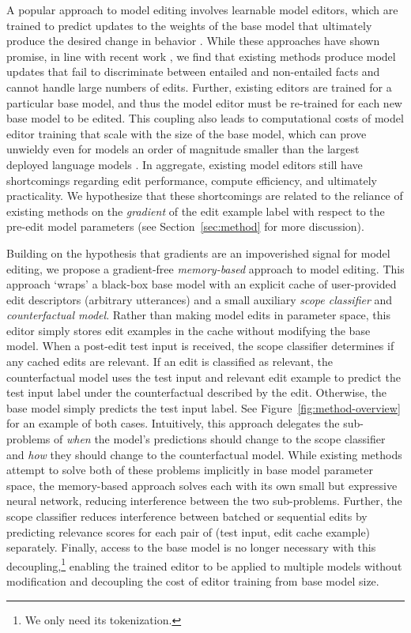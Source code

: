 \documentclass{article}
\begin{document}


A popular approach to model editing involves learnable model editors, which are trained to predict updates to the weights of the base model that ultimately produce the desired change in behavior \citep{Sinitsin2020Editable,Cao2021EditingFK,mitchell2021fast,hase2021language}. While these approaches have shown promise, in line with recent work \citep{hase2021language}, we find that existing methods produce model updates that fail to discriminate between entailed and non-entailed facts and cannot handle large numbers of edits. Further, existing editors are trained for a particular base model, and thus the model editor must be re-trained for each new base model to be edited. This coupling also leads to computational costs of model editor training that scale with the size of the base model, which can prove unwieldy even for models an order of magnitude smaller than the largest deployed language models \citep{mitchell2021fast}. In aggregate, existing model editors still have shortcomings regarding edit performance, compute efficiency, and ultimately practicality. We hypothesize that these shortcomings are related to the reliance of existing methods on the \textit{gradient} of the edit example label with respect to the pre-edit model parameters (see Section~\ref{sec:method} for more discussion).



Building on the hypothesis that gradients are an impoverished signal for model editing, we propose a gradient-free \textit{memory-based} approach to model editing. This approach `wraps' a black-box base model with an explicit cache of user-provided edit descriptors (arbitrary utterances) and a small auxiliary \textit{scope classifier} and \textit{counterfactual model}. Rather than making model edits in parameter space, this editor simply stores edit examples in the cache without modifying the base model. When a post-edit test input is received, the scope classifier determines if any cached edits are relevant. If an edit is classified as relevant, the counterfactual model uses the test input and relevant edit example to predict the test input label under the counterfactual described by the edit. Otherwise, the base model simply predicts the test input label. See Figure~\ref{fig:method-overview} for an example of both cases. Intuitively, this approach delegates the sub-problems of \textit{when} the model's predictions should change to the scope classifier and \textit{how} they should change to the counterfactual model. While existing methods attempt to solve both of these problems implicitly in base model parameter space, the memory-based approach solves each with its own small but expressive neural network, reducing interference between the two sub-problems. Further, the scope classifier reduces interference between batched or sequential edits by predicting relevance scores for each pair of (test input, edit cache example) separately. Finally, access to the base model is no longer necessary with this decoupling,\footnote{We only need its tokenization.} enabling the trained editor to be applied to multiple models without modification and decoupling the cost of editor training from base model size.
\end{document}
